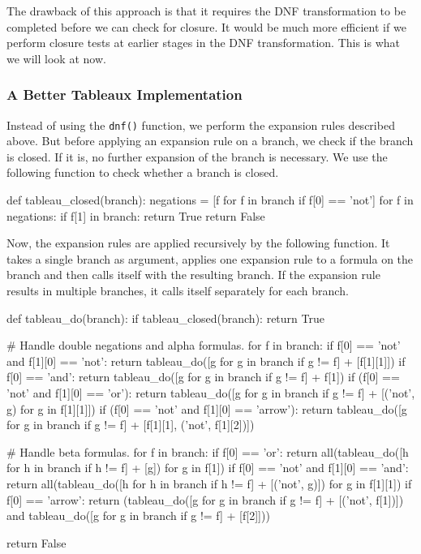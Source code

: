 \documentclass[a4paper,notitlepage]{scrartcl}
\begin{document}
The drawback of this approach is that it requires the DNF transformation to be
completed before we can check for closure. It would be much more efficient if
we perform closure tests at earlier stages in the DNF transformation. This is
what we will look at now.

\subsubsection{A Better Tableaux Implementation}

Instead of using the \texttt{dnf()} function, we perform the expansion rules
described above. But before applying an expansion rule on a branch, we check if
the branch is closed. If it is, no further expansion of the branch is
necessary. We use the following function to check whether a branch is closed.

\begin{code}
def tableau_closed(branch):
    negations = [f for f in branch if f[0] == 'not']
    for f in negations:
        if f[1] in branch:
            return True
    return False
\end{code}

Now, the expansion rules are applied recursively by the following function. It
takes a single branch as argument, applies one expansion rule to a formula on
the branch and then calls itself with the resulting branch. If the expansion
rule results in multiple branches, it calls itself separately for each branch.

\begin{code}
def tableau_do(branch):
    if tableau_closed(branch):
        return True

    # Handle double negations and alpha formulas.
    for f in branch:
        if f[0] == 'not' and f[1][0] == 'not':
            return tableau_do([g for g in branch if g != f] + [f[1][1]])
        if f[0] == 'and':
            return tableau_do([g for g in branch if g != f] + f[1])
        if (f[0] == 'not' and f[1][0] == 'or'):
            return tableau_do([g for g in branch if g != f] +
                [('not', g) for g in f[1][1]])
        if (f[0] == 'not' and f[1][0] == 'arrow'):
            return tableau_do([g for g in branch if g != f] +
                [f[1][1], ('not', f[1][2])])

    # Handle beta formulas.
    for f in branch:
        if f[0] == 'or':
            return all(tableau_do([h for h in branch if h != f] + [g])
                for g in f[1])
        if f[0] == 'not' and f[1][0] == 'and':
            return all(tableau_do([h for h in branch if h != f] + [('not', g)])
                for g in f[1][1])
        if f[0] == 'arrow':
            return (tableau_do([g for g in branch if g != f] + [('not', f[1])])
                and tableau_do([g for g in branch if g != f] + [f[2]]))

    return False
\end{code}
\end{document}
